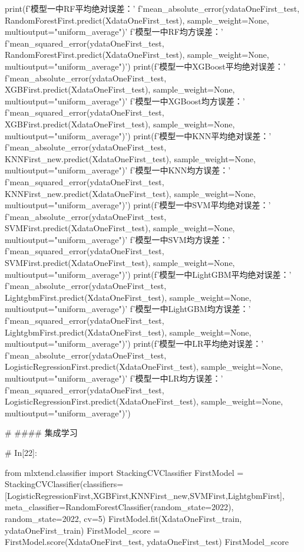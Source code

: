 \documentclass{MathorCupmodeling}
\begin{document}
\begin{python}
print(f'模型一中RF平均绝对误差：'
      f'{mean_absolute_error(ydataOneFirst_test, RandomForestFirst.predict(XdataOneFirst_test), sample_weight=None, multioutput="uniform_average")}\n'
      f'模型一中RF均方误差：'
      f'{mean_squared_error(ydataOneFirst_test, RandomForestFirst.predict(XdataOneFirst_test), sample_weight=None, multioutput="uniform_average")}')
print(f'模型一中XGBoost平均绝对误差：'
      f'{mean_absolute_error(ydataOneFirst_test, XGBFirst.predict(XdataOneFirst_test), sample_weight=None, multioutput="uniform_average")}\n'
      f'模型一中XGBoost均方误差：'
      f'{mean_squared_error(ydataOneFirst_test, XGBFirst.predict(XdataOneFirst_test), sample_weight=None, multioutput="uniform_average")}')
print(f'模型一中KNN平均绝对误差：'
      f'{mean_absolute_error(ydataOneFirst_test, KNNFirst_new.predict(XdataOneFirst_test), sample_weight=None, multioutput="uniform_average")}\n'
      f'模型一中KNN均方误差：'
      f'{mean_squared_error(ydataOneFirst_test, KNNFirst_new.predict(XdataOneFirst_test), sample_weight=None, multioutput="uniform_average")}')
print(f'模型一中SVM平均绝对误差：'
      f'{mean_absolute_error(ydataOneFirst_test, SVMFirst.predict(XdataOneFirst_test), sample_weight=None, multioutput="uniform_average")}\n'
      f'模型一中SVM均方误差：'
      f'{mean_squared_error(ydataOneFirst_test, SVMFirst.predict(XdataOneFirst_test), sample_weight=None, multioutput="uniform_average")}')
print(f'模型一中LightGBM平均绝对误差：'
      f'{mean_absolute_error(ydataOneFirst_test, LightgbmFirst.predict(XdataOneFirst_test), sample_weight=None, multioutput="uniform_average")}\n'
      f'模型一中LightGBM均方误差：'
      f'{mean_squared_error(ydataOneFirst_test, LightgbmFirst.predict(XdataOneFirst_test), sample_weight=None, multioutput="uniform_average")}')
print(f'模型一中LR平均绝对误差：'
      f'{mean_absolute_error(ydataOneFirst_test, LogisticRegressionFirst.predict(XdataOneFirst_test), sample_weight=None, multioutput="uniform_average")}\n'
      f'模型一中LR均方误差：'
      f'{mean_squared_error(ydataOneFirst_test, LogisticRegressionFirst.predict(XdataOneFirst_test), sample_weight=None, multioutput="uniform_average")}')


# #### 集成学习

# In[22]:


from mlxtend.classifier import StackingCVClassifier
FirstModel = StackingCVClassifier(classifiers=[LogisticRegressionFirst,XGBFirst,KNNFirst_new,SVMFirst,LightgbmFirst], meta_classifier=RandomForestClassifier(random_state=2022), random_state=2022, cv=5)
FirstModel.fit(XdataOneFirst_train, ydataOneFirst_train)
FirstModel_score = FirstModel.score(XdataOneFirst_test, ydataOneFirst_test)
FirstModel_score



\end{python}
\end{document}

